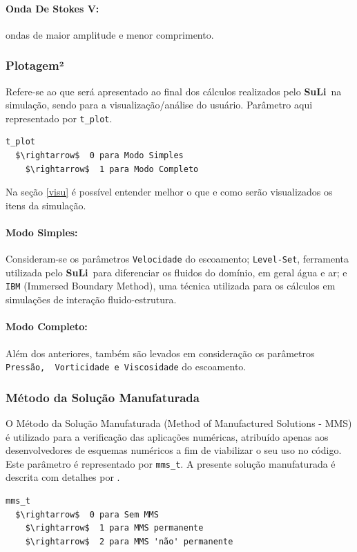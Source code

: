 \documentclass[12pt, a4paper]{article}
\newcommand{\SL}{{\bf SuLi}}
\begin{document}
\paragraph{Onda De Stokes V:} ondas de maior amplitude e menor comprimento.


\subsubsection{Plotagem²}
Refere-se ao que será apresentado ao final dos cálculos realizados pelo \SL\ na simulação, sendo para a visualização/análise do usuário. Parâmetro aqui representado por \verb|t_plot|.
\begin{lstlisting}
t_plot	
  $\rightarrow$  0 para Modo Simples
	$\rightarrow$  1 para Modo Completo
\end{lstlisting}
Na seção \ref{visu} é possível entender melhor o que e como serão visualizados os itens da simulação.

\paragraph{Modo Simples:} Consideram-se os parâmetros \verb|Velocidade| do escoamento; \verb|Level-Set|, ferramenta utilizada pelo \SL\ para diferenciar os fluidos do domínio, em geral água e ar; e \verb|IBM| (Immersed Boundary Method), uma técnica utilizada para os cálculos em simulações de interação fluido-estrutura.
\paragraph{Modo Completo:} Além dos anteriores, também são levados em consideração os parâmetros \verb|Pressão,  Vorticidade e Viscosidade| do escoamento.

\subsubsection{Método da Solução Manufaturada}
O Método da Solução Manufaturada (Method of Manufactured Solutions - MMS) é utilizado para a verificação das aplicações numéricas, atribuído apenas aos desenvolvedores de esquemas numéricos a fim de viabilizar o seu uso no código. Este parâmetro é representado por \verb|mms_t|. A presente solução manufaturada é descrita com detalhes por \cite{wang2009}.

\begin{lstlisting}[escapeinside='']
mms_t	
  $\rightarrow$  0 para Sem MMS
	$\rightarrow$  1 para MMS permanente
	$\rightarrow$  2 para MMS 'não' permanente
\end{lstlisting}
\end{document}
